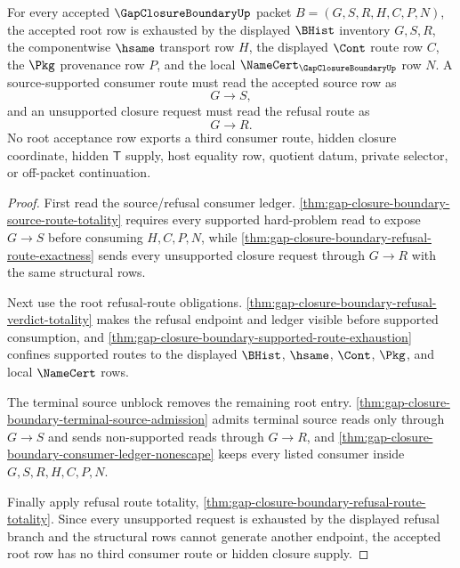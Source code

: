 \begin{theorem}
\label{thm:gap-closure-boundary-acceptance-row-exhaustion}
For every accepted $\GapClosureBoundaryUp$ packet $B=(G,S,R,H,C,P,N)$, the accepted root row is exhausted by the displayed $\BHist$ inventory $G,S,R$, the componentwise $\hsame$ transport row $H$, the displayed $\Cont$ route row $C$, the $\Pkg$ provenance row $P$, and the local $\NameCert_{\GapClosureBoundaryUp}$ row $N$. A source-supported consumer route must read the accepted source row as
$$
G \longrightarrow S,
$$
and an unsupported closure request must read the refusal route as
$$
G \longrightarrow R.
$$
No root acceptance row exports a third consumer route, hidden closure coordinate, hidden $\mathsf{T}$ supply, host equality row, quotient datum, private selector, or off-packet continuation.
\end{theorem}
\begin{proof}
First read the source/refusal consumer ledger. \autoref{thm:gap-closure-boundary-source-route-totality} requires every supported hard-problem read to expose $G \longrightarrow S$ before consuming $H,C,P,N$, while \autoref{thm:gap-closure-boundary-refusal-route-exactness} sends every unsupported closure request through $G \longrightarrow R$ with the same structural rows.

Next use the root refusal-route obligations. \autoref{thm:gap-closure-boundary-refusal-verdict-totality} makes the refusal endpoint and ledger visible before supported consumption, and \autoref{thm:gap-closure-boundary-supported-route-exhaustion} confines supported routes to the displayed $\BHist$, $\hsame$, $\Cont$, $\Pkg$, and local $\NameCert$ rows.

The terminal source unblock removes the remaining root entry. \autoref{thm:gap-closure-boundary-terminal-source-admission} admits terminal source reads only through $G \longrightarrow S$ and sends non-supported reads through $G \longrightarrow R$, and \autoref{thm:gap-closure-boundary-consumer-ledger-nonescape} keeps every listed consumer inside $G,S,R,H,C,P,N$.

Finally apply refusal route totality, \autoref{thm:gap-closure-boundary-refusal-route-totality}. Since every unsupported request is exhausted by the displayed refusal branch and the structural rows cannot generate another endpoint, the accepted root row has no third consumer route or hidden closure supply.
\end{proof}

